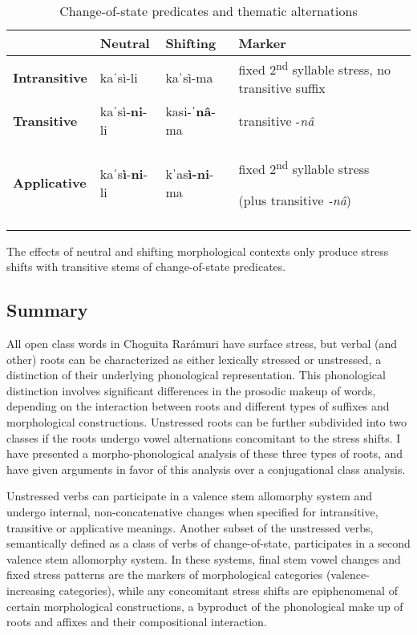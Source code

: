 \begin{table}
\caption{Change-of-state predicates and thematic alternations}
\label{tab:key:13}

\begin{tabularx}{\textwidth}{lllQ}
\lsptoprule
& \textbf{Neutral} & \textbf{Shifting} & \textbf{Marker}\\
\midrule
 \textbf{Intransitive} & kaˈsì-li & kaˈsì-ma & { fixed 2\textsuperscript{nd} syllable stress, no transitive suffix}\\
 \textbf{Transitive} & kaˈsì-\textbf{ni}{}-li & kasi-\textbf{ˈnâ}{}-ma & { transitive -\textit{nâ}}\\
 \textbf{Applicative} & kaˈs\textbf{ì}{}-\textbf{ni}{}-li & kˈas\textbf{ì-ni}{}-ma & { fixed 2\textsuperscript{nd} syllable stress}

 (plus transitive \textit{-nâ})\\
\lspbottomrule
\end{tabularx}
\end{table}

The effects of neutral and shifting morphological contexts only produce stress shifts with transitive stems of change-of-state predicates.

\subsection{Summary}
\label{subsec:9:summary:verbalroot}

All open class words in Choguita Rarámuri have surface stress, but verbal (and other) roots can be characterized as either lexically stressed or unstressed, a distinction of their underlying phonological representation. This phonological distinction involves significant differences in the prosodic makeup of words, depending on the interaction between roots and different types of suffixes and morphological constructions. Unstressed roots can be further subdivided into two classes if the roots undergo vowel alternations concomitant to the stress shifts. I have presented a morpho-phonological analysis of these three types of roots, and have given arguments in favor of this analysis over a conjugational class analysis.


Unstressed verbs can participate in a valence stem allomorphy system and undergo internal, non-concatenative changes when specified for intransitive, transitive or applicative meanings. Another subset of the unstressed verbs, semantically defined as a class of verbs of change-of-state, participates in a second valence stem allomorphy system. In these systems, final stem vowel changes and fixed stress patterns are the markers of morphological categories (valence-increasing categories), while any concomitant stress shifts are epiphenomenal of certain morphological constructions, a byproduct of the phonological make up of roots and affixes and their compositional interaction.


